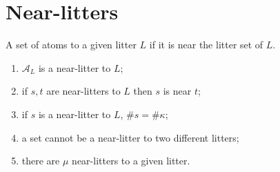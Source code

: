 \section{Near-litters}

\begin{definition}
    A set of atoms  to a given litter \( L \) if it is near the litter set of \( L \).
\end{definition}
\begin{lemma}
    \label{lem:isNearLitter}
    \begin{enumerate}
        \item \( \mathcal A_L \) is a near-litter to \( L \);
        \item if \( s, t \) are near-litters to \( L \) then \( s \) is near \( t \);
        \item if \( s \) is a near-litter to \( L \), \( \#s = \#\kappa \);
        \item a set cannot be a near-litter to two different litters;
        \item there are \( \mu \) near-litters to a given litter.
    \end{enumerate}
\end{lemma}
